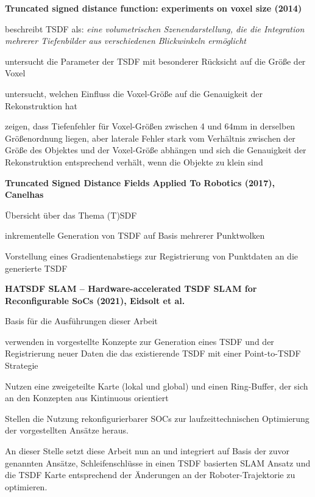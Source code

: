 \textbf{Truncated signed distance function: experiments on voxel size (2014)}\cite{werner2014truncated}

\begin{description}
\item
beschreibt TSDF als: \emph{eine volumetrischen Szenendarstellung, die die Integration mehrerer Tiefenbilder aus verschiedenen Blickwinkeln ermöglicht}
\item
untersucht die Parameter der TSDF mit besonderer Rücksicht auf die Größe der Voxel
\item
untersucht, welchen Einfluss die Voxel-Größe auf die Genauigkeit der Rekonstruktion hat
\item
zeigen, dass Tiefenfehler für Voxel-Größen zwischen 4 und 64mm in derselben Größenordnung liegen, aber laterale Fehler stark vom Verhältnis zwischen der Größe des Objektes und der Voxel-Größe abhängen und sich die Genauigkeit der Rekonstruktion entsprechend verhält, wenn die Objekte zu klein sind
\end{description}


\textbf{Truncated Signed Distance Fields Applied To Robotics (2017), Canelhas} \cite{Canelhas2017TruncatedSD}

\begin{description}
\item
Übersicht über das Thema (T)SDF
\item
inkrementelle Generation von TSDF auf Basis mehrerer Punktwolken
\item
Vorstellung eines Gradientenabstiegs zur Registrierung von Punktdaten an die generierte TSDF
\end{description}


\textbf{HATSDF SLAM – Hardware-accelerated TSDF SLAM for Reconfigurable SoCs (2021), Eidsolt et al.}

\begin{description}
\item
Basis für die Ausführungen dieser Arbeit
\item
verwenden in \cite{Canelhas2017TruncatedSD} vorgestellte Konzepte zur Generation eines TSDF und der Registrierung neuer Daten die das existierende TSDF mit einer Point-to-TSDF Strategie
\item
Nutzen eine zweigeteilte Karte (lokal und global) und einen Ring-Buffer, der sich an den Konzepten aus Kintinuous \cite{whelan2012kintinuous} orientiert
\item
Stellen die Nutzung rekonfigurierbarer SOCs zur laufzeittechnischen Optimierung der vorgestellten Ansätze heraus.
\end{description}


An dieser Stelle setzt diese Arbeit nun an und integriert auf Basis der zuvor genannten Ansätze, Schleifenschlüsse in einen TSDF basierten SLAM Ansatz und die TSDF Karte entsprechend der Änderungen an der Roboter-Trajektorie zu optimieren.





